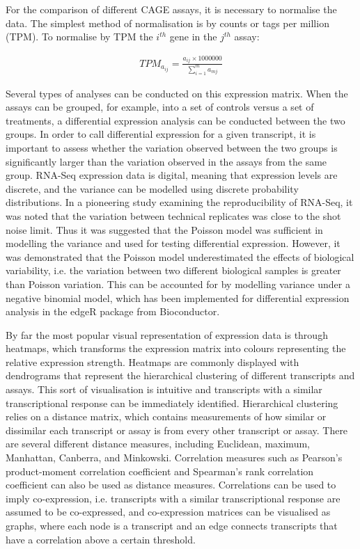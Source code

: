 For the comparison of different CAGE assays, it is necessary to normalise the data. The simplest method of normalisation is by counts or tags per million (TPM). To normalise by TPM the $i^{th}$ gene in the $j^{th}$ assay:

\begin{align*}
   TPM_{a_{ij}} = \frac{a_{ij} \times 1000000}{\sum_{i=1}^{m}{a_{mj}}}
\end{align*}

Several types of analyses can be conducted on this expression matrix. When the assays can be grouped, for example, into a set of controls versus a set of treatments, a differential expression analysis can be conducted between the two groups. In order to call differential expression for a given transcript, it is important to assess whether the variation observed between the two groups is significantly larger than the variation observed in the assays from the same group. RNA-Seq expression data is digital, meaning that expression levels are discrete, and the variance can be modelled using discrete probability distributions. In a pioneering study examining the reproducibility of RNA-Seq, it was noted that the variation between technical replicates was close to the shot noise limit\cite{pmid18550803}. Thus it was suggested that the Poisson model was sufficient in modelling the variance and used for testing differential expression. However, it was demonstrated that the Poisson model underestimated the effects of biological variability, i.e. the variation between two different biological samples is greater than Poisson variation\cite{20979621}. This can be accounted for by modelling variance under a negative binomial model, which has been implemented for differential expression analysis in the edgeR package\cite{pmid19910308} from Bioconductor\cite{pmid15461798}.

By far the most popular visual representation of expression data is through heatmaps, which transforms the expression matrix into colours representing the relative expression strength. Heatmaps are commonly displayed with dendrograms that represent the hierarchical clustering of different transcripts and assays\cite{pmid9843981}. This sort of visualisation is intuitive and transcripts with a similar transcriptional response can be immediately identified. Hierarchical clustering relies on a distance matrix, which contains measurements of how similar or dissimilar each transcript or assay is from every other transcript or assay. There are several different distance measures, including Euclidean, maximum, Manhattan, Canberra, and Minkowski. Correlation measures such as Pearson's product-moment correlation coefficient and Spearman's rank correlation coefficient can also be used as distance measures. Correlations can be used to imply co-expression, i.e. transcripts with a similar transcriptional response are assumed to be co-expressed, and co-expression matrices can be visualised as graphs, where each node is a transcript and an edge connects transcripts that have a correlation above a certain threshold.
